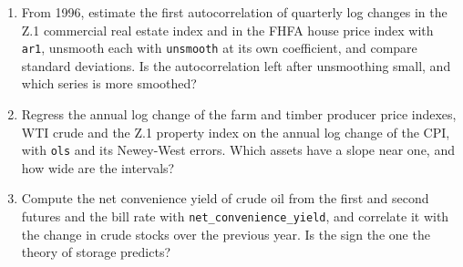 \begin{chapterrefs}
\begin{enumerate}[label=\textbf{P10.\arabic*}, leftmargin=*, ref=P10.\arabic*]
\item From 1996, estimate the first autocorrelation of quarterly log changes in the Z.1 commercial real estate
index and in the FHFA house price index with \texttt{ar1}, unsmooth each with \texttt{unsmooth} at its own
coefficient, and compare standard deviations. Is the autocorrelation left after unsmoothing small, and
which series is more smoothed?
\item Regress the annual log change of the farm and timber producer price indexes, WTI crude and the Z.1
property index on the annual log change of the CPI, with \texttt{ols} and its Newey-West errors. Which
assets have a slope near one, and how wide are the intervals?
\item Compute the net convenience yield of crude oil from the first and second futures and the bill rate with
\texttt{net\_convenience\_yield}, and correlate it with the change in crude stocks over the previous year.
Is the sign the one the theory of storage predicts?
\end{enumerate}


\end{chapterrefs}

